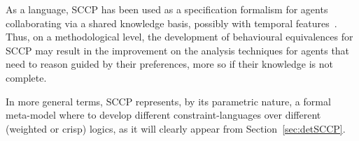 \documentclass[main.tex]{subfiles}
\begin{document}
As a language, SCCP has been used as a specification formalism for agents collaborating 
via a shared knowledge basis, possibly with temporal features~\cite{coordination08,tplp15}.
Thus, on a methodological level, the development of behavioural equivalences for SCCP may result in the improvement	
on the analysis techniques for agents that need to reason guided by their preferences, more so if their knowledge 
 is not complete. 
%

In more general terms, SCCP  represents, by its parametric nature, a formal meta-model where to develop different constraint-languages over different (weighted or crisp) logics, as it will clearly appear from Section~\ref{sec:detSCCP}.

%
\end{document}
